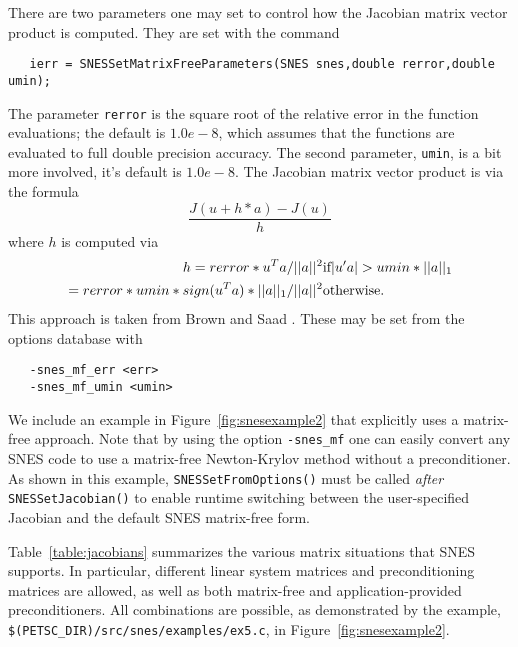 There are two parameters one may set to control how the Jacobian matrix vector
product is computed. They are set with the command
\begin{verbatim}
   ierr = SNESSetMatrixFreeParameters(SNES snes,double rerror,double umin);
\end{verbatim}
The parameter {\tt rerror} is the square root of 
the 
relative error in the function evaluations; the default is $ 1.0e-8$, which assumes
that the functions are evaluated to full double precision accuracy. The 
second parameter, {\tt umin}, is a bit more involved, it's default is 
$ 1.0e-8$. The Jacobian matrix vector product is via the formula
\[
    \frac{J(u + h*a) - J(u)}{h}
\]
where $ h$ is computed via 
\begin{eqnarray*}
        h = rerror*u^{T}a/||a||^2                       &    \hbox{if}  |u'a| > umin*||a||_{1} \\
          = rerror*umin*sign(u^{T}a)*||a||_{1}/||a||^2  &    \hbox{otherwise}.
\end{eqnarray*}
This approach is taken from Brown and Saad \cite{brownsaad:90}.
These may be set from the options database with 
\begin{verbatim}
   -snes_mf_err <err>
   -snes_mf_umin <umin>
\end{verbatim}
 

We include an example in Figure~\ref{fig:snesexample2} that explicitly
uses a matrix-free approach.  Note that by using the option 
{\tt -snes\_mf} one can easily convert any SNES code to use a matrix-free
Newton-Krylov method without a preconditioner.  As shown in this
example, {\tt SNESSetFromOptions()} must be called {\em after}
{\tt SNESSetJacobian()} to enable runtime switching between the
user-specified Jacobian and the default SNES matrix-free form.

Table~\ref{table:jacobians} summarizes the various matrix situations
that SNES supports.  In particular, different linear system matrices
and preconditioning matrices are allowed, as well as both matrix-free
and application-provided preconditioners.  All combinations are
possible, as demonstrated by the example, 
{\tt \$(PETSC\_DIR)/src/snes/\-examples/ex5.c},
 in Figure~\ref{fig:snesexample2}.

